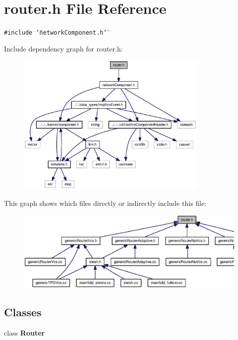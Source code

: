 \section{router.h File Reference}
\label{router_8h}
{\tt \#include \char`\"{}networkComponent.h\char`\"{}}\par


Include dependency graph for router.h:\nopagebreak
\begin{figure}[H]
\begin{center}
\leavevmode
\includegraphics[width=262pt]{router_8h__incl}
\end{center}
\end{figure}


This graph shows which files directly or indirectly include this file:\nopagebreak
\begin{figure}[H]
\begin{center}
\leavevmode
\includegraphics[width=359pt]{router_8h__dep__incl}
\end{center}
\end{figure}
\subsection*{Classes}
\begin{CompactItemize}
\item 
class {\bf Router}
\end{CompactItemize}
